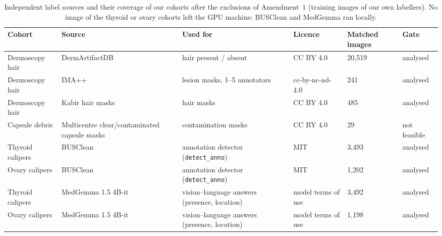 \begin{table}[H]\centering\scriptsize
\caption{Independent label sources and their coverage of our cohorts after the exclusions of Amendment~1 (training images of our own labellers). No image of the thyroid or ovary cohorts left the GPU machine: BUSClean and MedGemma ran locally.}\label{tab:cov}
\begin{tabular}{p{2.2cm}p{3.2cm}p{3.4cm}p{2.4cm}p{1.6cm}p{1.6cm}}\toprule
Cohort & Source & Used for & Licence & Matched images & Gate \\\midrule
Dermoscopy hair & DermArtifactDB & hair present / absent & CC BY 4.0 & 20{,}519 & analysed \\
Dermoscopy hair & IMA{+}{+} & lesion masks, 1--5 annotators & cc-by-nc-nd-4.0 & 241 & analysed \\
Dermoscopy hair & Kabir hair masks & hair masks & CC BY 4.0 & 485 & analysed \\
Capsule debris & Multicentre clear/contaminated capsule masks & contamination masks & CC BY 4.0 & 29 & not feasible \\
Thyroid calipers & BUSClean & annotation detector (\texttt{detect\_anno}) & MIT & 3{,}493 & analysed \\
Ovary calipers & BUSClean & annotation detector (\texttt{detect\_anno}) & MIT & 1{,}202 & analysed \\
Thyroid calipers & MedGemma 1.5 4B-it & vision--language answers (presence, location) & model terms of use & 3{,}492 & analysed \\
Ovary calipers & MedGemma 1.5 4B-it & vision--language answers (presence, location) & model terms of use & 1{,}198 & analysed \\
\bottomrule\end{tabular}
\end{table}
